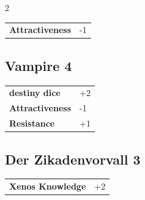 \begin{multicols}{2}
\begin{tcolorbox}
\begin{tabular}{@{}ll@{}}
    \textbf{Attractiveness} & -1\\
\end{tabular}


\end{tcolorbox}

\begin{tcolorbox}
    \subsection*{Vampire \hfill \small{4 }}
    \tcblower




\begin{tabular}{@{}ll@{}}
    \textbf{destiny dice} & +2\\
    \textbf{Attractiveness} & -1\\
    \textbf{Resistance} & +1\\
\end{tabular}


\end{tcolorbox}

\begin{tcolorbox}
    \subsection*{Der Zikadenvorvall \hfill \small{3 }}
    \tcblower




\begin{tabular}{@{}ll@{}}
    \textbf{Xenos Knowledge} & +2\\
\end{tabular}


\end{tcolorbox}

\end{multicols}